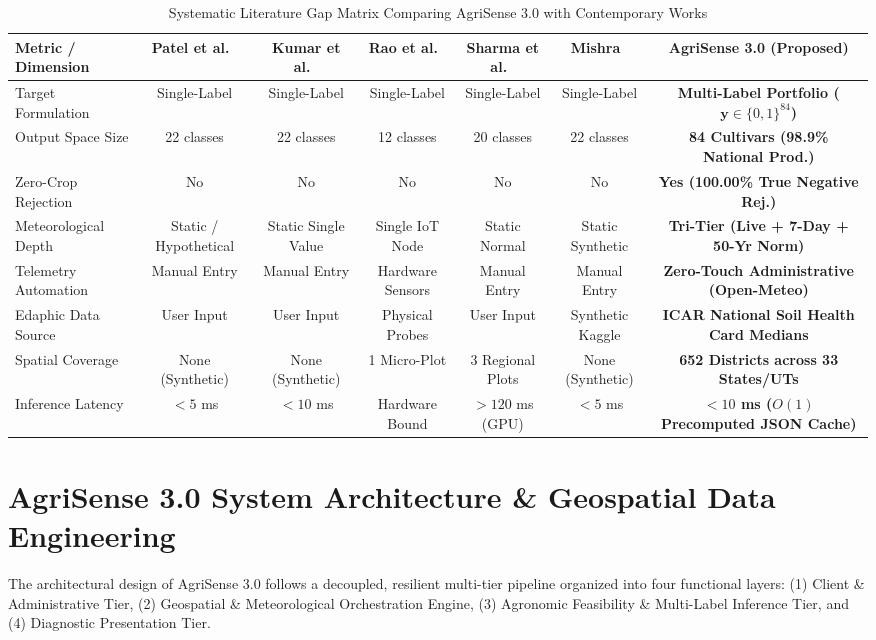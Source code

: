 \documentclass[conference]{IEEEtran}
\begin{document}
\begin{table}[t]
\centering
\caption{Systematic Literature Gap Matrix Comparing AgriSense 3.0 with Contemporary Works}
\label{tab:lit_gap}
\begin{tabular}{lcccccc}
\toprule
\textbf{Metric / Dimension} & \textbf{Patel et al.~\cite{patel2020crop}} & \textbf{Kumar et al.~\cite{kumar2021machine}} & \textbf{Rao et al.~\cite{rao2022iot}} & \textbf{Sharma et al.~\cite{sharma2023deep}} & \textbf{Mishra~\cite{mishra2026explainable}} & \textbf{AgriSense 3.0 (Proposed)} \\
\midrule
Target Formulation & Single-Label & Single-Label & Single-Label & Single-Label & Single-Label & \textbf{Multi-Label Portfolio ($\mathbf{y} \in \{0,1\}^{84}$)} \\
Output Space Size & 22 classes & 22 classes & 12 classes & 20 classes & 22 classes & \textbf{84 Cultivars (98.9\% National Prod.)} \\
Zero-Crop Rejection & No & No & No & No & No & \textbf{Yes (100.00\% True Negative Rej.)} \\
Meteorological Depth & Static / Hypothetical & Static Single Value & Single IoT Node & Static Normal & Static Synthetic & \textbf{Tri-Tier (Live + 7-Day + 50-Yr Norm)} \\
Telemetry Automation & Manual Entry & Manual Entry & Hardware Sensors & Manual Entry & Manual Entry & \textbf{Zero-Touch Administrative (Open-Meteo)} \\
Edaphic Data Source & User Input & User Input & Physical Probes & User Input & Synthetic Kaggle & \textbf{ICAR National Soil Health Card Medians} \\
Spatial Coverage & None (Synthetic) & None (Synthetic) & 1 Micro-Plot & 3 Regional Plots & None (Synthetic) & \textbf{652 Districts across 33 States/UTs} \\
Inference Latency & $<5$ ms & $<10$ ms & Hardware Bound & $>120$ ms (GPU) & $<5$ ms & \textbf{$<10$ ms ($O(1)$ Precomputed JSON Cache)} \\
\bottomrule
\end{tabular}
\end{table}

\section{AgriSense 3.0 System Architecture \& Geospatial Data Engineering}

The architectural design of AgriSense 3.0 follows a decoupled, resilient multi-tier pipeline organized into four functional layers: (1) Client \& Administrative Tier, (2) Geospatial \& Meteorological Orchestration Engine, (3) Agronomic Feasibility \& Multi-Label Inference Tier, and (4) Diagnostic Presentation Tier.
\end{document}
